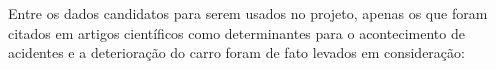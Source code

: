     Entre os dados candidatos para serem usados no projeto, apenas os que foram citados em artigos científicos como determinantes para o acontecimento de acidentes e a deterioração do carro foram de fato levados em consideração:

